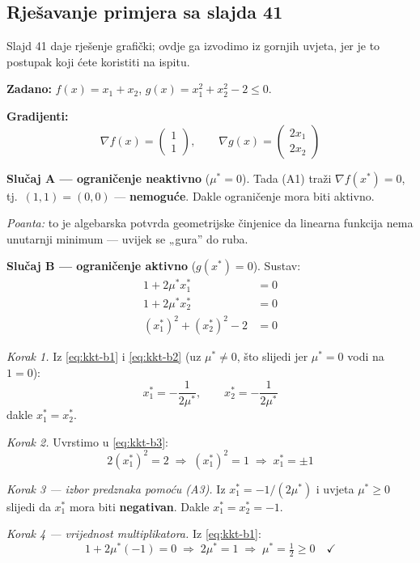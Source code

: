 \subsection{Rješavanje primjera sa slajda 41}

Slajd 41 daje rješenje grafički; ovdje ga izvodimo iz gornjih uvjeta, jer je to
postupak koji ćete koristiti na ispitu.

\textbf{Zadano:} $f(x) = x_1+x_2$, $g(x) = x_1^2+x_2^2-2 \le 0$.

\textbf{Gradijenti:}
\[
\nabla f(x) = \begin{pmatrix}1\\1\end{pmatrix}, \qquad
\nabla g(x) = \begin{pmatrix}2x_1\\2x_2\end{pmatrix}
\]

\textbf{Slučaj A --- ograničenje neaktivno} ($\mu^{*} = 0$). Tada (A1) traži
$\nabla f(x^{*}) = 0$, tj.\ $(1,1) = (0,0)$ --- \textbf{nemoguće}. Dakle
ograničenje mora biti aktivno.

\emph{Poanta:} to je algebarska potvrda geometrijske činjenice da linearna
funkcija nema unutarnji minimum --- uvijek se „gura” do ruba.

\textbf{Slučaj B --- ograničenje aktivno} ($g(x^{*}) = 0$). Sustav:
\begin{align}
1 + 2\mu^{*} x_1^{*} &= 0 \label{eq:kkt-b1}\\
1 + 2\mu^{*} x_2^{*} &= 0 \label{eq:kkt-b2}\\
(x_1^{*})^2 + (x_2^{*})^2 - 2 &= 0 \label{eq:kkt-b3}
\end{align}

\emph{Korak 1.} Iz \eqref{eq:kkt-b1} i \eqref{eq:kkt-b2} (uz $\mu^{*} \ne 0$,
što slijedi jer $\mu^{*}=0$ vodi na $1 = 0$):
\[
x_1^{*} = -\frac{1}{2\mu^{*}}, \qquad x_2^{*} = -\frac{1}{2\mu^{*}}
\]
dakle $x_1^{*} = x_2^{*}$.

\emph{Korak 2.} Uvrstimo u \eqref{eq:kkt-b3}:
\[
2(x_1^{*})^2 = 2 \;\Longrightarrow\; (x_1^{*})^2 = 1
\;\Longrightarrow\; x_1^{*} = \pm 1
\]

\emph{Korak 3 --- izbor predznaka pomoću (A3).} Iz
$x_1^{*} = -1/(2\mu^{*})$ i uvjeta $\mu^{*} \ge 0$ slijedi da $x_1^{*}$ mora
biti \textbf{negativan}. Dakle $x_1^{*} = x_2^{*} = -1$.

\emph{Korak 4 --- vrijednost multiplikatora.} Iz \eqref{eq:kkt-b1}:
\[
1 + 2\mu^{*}(-1) = 0 \;\Longrightarrow\; 2\mu^{*} = 1
\;\Longrightarrow\; \mu^{*} = \tfrac12 \ge 0 \quad\checkmark
\]


